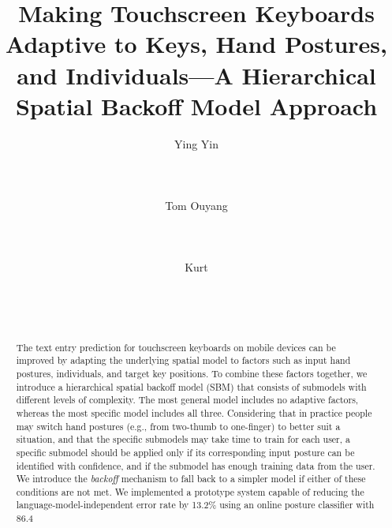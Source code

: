 \documentclass{sigchi}
\begin{document}
\title{Making Touchscreen Keyboards Adaptive to Keys, Hand Postures,  and Individuals---A Hierarchical Spatial Backoff Model Approach}

\author{
 \alignauthor Ying Yin\\
   \\
   \\
   \\
 \alignauthor Tom Ouyang\\
   \\
   \\
   \\
 \alignauthor Kurt\\
   \\
   \\
   \\
}


\maketitle

\begin{abstract}
The text entry prediction for touchscreen keyboards on mobile devices can be improved by adapting the underlying spatial model to factors such as input hand postures, individuals, and target key positions. To
combine these factors together, we introduce a hierarchical spatial backoff
model (SBM) that consists of submodels with different levels of
complexity. The most general model includes no adaptive factors, whereas the most specific model includes all three. Considering that in practice people may
switch hand postures (e.g., from two-thumb to one-finger) to better suit a situation,
and that the specific submodels may take time to train for each user,  a specific
submodel should be applied only if its corresponding input posture can be identified with
confidence, and if the submodel has enough training data from the user.  We
introduce the \textit{backoff} mechanism to fall back to a simpler model if
either of these conditions are not met.  We implemented a prototype system capable of reducing the language-model-independent error rate by 13.2\% using an online posture classifier with 86.4%

\end{abstract}
\end{document}
